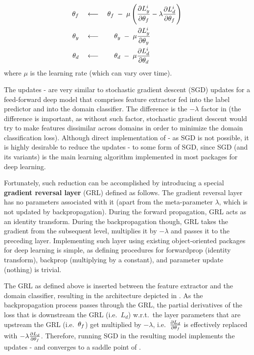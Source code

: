 \begin{align}
{\theta_f} \quad &\longleftarrow \quad {\theta_f} \;-\; \mu \left(\frac{\partial L^i_y}{\partial {\theta_f}}-\lambda\frac{\partial L^i_d}{\partial {\theta_f}} \right) \label{eq:upd1}\\
{\theta_y} \quad &\longleftarrow \qquad {\theta_y} \;-\; \mu \frac{\partial L^i_y}{\partial {\theta_y}}\label{eq:upd2}\\
{\theta_d} \quad &\longleftarrow \qquad {\theta_d} \;-\; \mu \frac{\partial L^i_d}{\partial {\theta_d}} \label{eq:upd3}
\end{align}
where $\mu$ is the learning rate (which can vary over time).

The updates - are very similar to stochastic gradient descent (SGD) updates for a feed-forward deep model that comprises feature extractor fed into the label predictor and into the domain classifier. The difference is the $-\lambda$ factor in  (the difference is important, as without such factor, stochastic gradient descent would try to make features dissimilar across domains in order to minimize the domain classification loss). Although direct implementation of - as SGD is not possible, it is highly desirable to reduce the updates - to some form of SGD, since SGD (and its variants) is the main learning algorithm implemented in most packages for deep learning. 

Fortunately, such reduction can be accomplished by introducing a special {\bf gradient reversal layer} (GRL) defined as follows. The gradient reversal layer has no parameters associated with it (apart from the meta-parameter $\lambda$, which is not updated by backpropagation). During the forward propagation, GRL acts as an identity transform. During the backpropagation though, GRL takes the gradient from the subsequent level, multiplies it by $-\lambda$ and passes it to the preceding layer. Implementing such layer using existing object-oriented packages for deep learning is simple, as defining procedures for forwardprop (identity transform), backprop (multiplying by a constant), and parameter update (nothing) is trivial. 

The GRL as defined above is inserted between the feature extractor and the domain classifier, resulting in the architecture depicted in . As the backpropagation process passes through the GRL, the partial derivatives of the loss that is downstream the GRL (i.e.\ $L_d$) w.r.t.\ the layer parameters that are upstream the GRL (i.e.\ ${\theta_f}$) get multiplied by $-\lambda$, i.e.\ $\frac{\partial L_d}{\partial {\theta_f}}$ is effectively replaced with $-\lambda\frac{\partial L_d}{\partial {\theta_f}}$. Therefore, running SGD in the resulting model implements the updates - and converges to a saddle point of .

